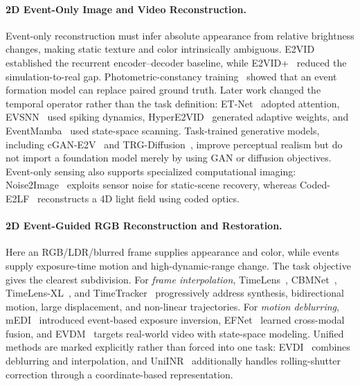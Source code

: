\paragraph{2D Event-Only Image and Video Reconstruction.}
Event-only reconstruction must infer absolute appearance from relative brightness changes, making static texture and color intrinsically ambiguous. E2VID~\cite{rebecq2019e2vid} established the recurrent encoder--decoder baseline, while E2VID+~\cite{stoffregen2020hqf} reduced the simulation-to-real gap. Photometric-constancy training~\cite{paredes2021backtoeventbasics} showed that an event formation model can replace paired ground truth. Later work changed the temporal operator rather than the task definition: ET-Net~\cite{weng2021etnet} adopted attention, EVSNN~\cite{zhu2022evsnn} used spiking dynamics, HyperE2VID~\cite{ercan2024hypere2vid} generated adaptive weights, and EventMamba~\cite{zhang2025eventmamba} used state-space scanning. Task-trained generative models, including cGAN-E2V~\cite{wang2019cgane2v} and TRG-Diffusion~\cite{zhu2024trgdiffusion}, improve perceptual realism but do not import a foundation model merely by using GAN or diffusion objectives. Event-only sensing also supports specialized computational imaging: Noise2Image~\cite{cao2025noise2image} exploits sensor noise for static-scene recovery, whereas Coded-E2LF~\cite{tsuchida2026coded} reconstructs a 4D light field using coded optics.

\paragraph{2D Event-Guided RGB Reconstruction and Restoration.}
Here an RGB/LDR/blurred frame supplies appearance and color, while events supply exposure-time motion and high-dynamic-range change. The task objective gives the clearest subdivision. For \textit{frame interpolation}, TimeLens~\cite{tulyakov2021timelens}, CBMNet~\cite{kim2023cbmnet}, TimeLens-XL~\cite{ma2024timelensxl}, and TimeTracker~\cite{liu2025timetracker} progressively address synthesis, bidirectional motion, large displacement, and non-linear trajectories. For \textit{motion deblurring}, mEDI~\cite{pan2019medi} introduced event-based exposure inversion, EFNet~\cite{sun2022efnet} learned cross-modal fusion, and EVDM~\cite{zhang2025evdm} targets real-world video with state-space modeling. Unified methods are marked explicitly rather than forced into one task: EVDI~\cite{zhang2022evdi} combines deblurring and interpolation, and UniINR~\cite{lu2024uniinr} additionally handles rolling-shutter correction through a coordinate-based representation.

